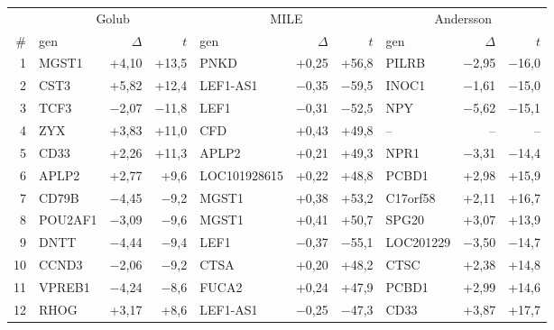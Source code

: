 \begin{tabular}{@{}r lrr lrr lrr@{}}
\toprule
 & \multicolumn{3}{c}{Golub} & \multicolumn{3}{c}{MILE} & \multicolumn{3}{c}{Andersson}\\
\cmidrule(lr){2-4}\cmidrule(lr){5-7}\cmidrule(l){8-10}
\# & gen & $\Delta$ & $t$ & gen & $\Delta$ & $t$ & gen & $\Delta$ & $t$\\ \midrule
1 & MGST1 & +4{,}10 & +13{,}5 & PNKD & +0{,}25 & +56{,}8 & PILRB & \ensuremath{-}2{,}95 & \ensuremath{-}16{,}0\\
2 & CST3 & +5{,}82 & +12{,}4 & LEF1-AS1 & \ensuremath{-}0{,}35 & \ensuremath{-}59{,}5 & INOC1 & \ensuremath{-}1{,}61 & \ensuremath{-}15{,}0\\
3 & TCF3 & \ensuremath{-}2{,}07 & \ensuremath{-}11{,}8 & LEF1 & \ensuremath{-}0{,}31 & \ensuremath{-}52{,}5 & NPY & \ensuremath{-}5{,}62 & \ensuremath{-}15{,}1\\
4 & ZYX & +3{,}83 & +11{,}0 & CFD & +0{,}43 & +49{,}8 & -- & -- & --\\
5 & CD33 & +2{,}26 & +11{,}3 & APLP2 & +0{,}21 & +49{,}3 & NPR1 & \ensuremath{-}3{,}31 & \ensuremath{-}14{,}4\\
6 & APLP2 & +2{,}77 & +9{,}6 & LOC101928615 & +0{,}22 & +48{,}8 & PCBD1 & +2{,}98 & +15{,}9\\
7 & CD79B & \ensuremath{-}4{,}45 & \ensuremath{-}9{,}2 & MGST1 & +0{,}38 & +53{,}2 & C17orf58 & +2{,}11 & +16{,}7\\
8 & POU2AF1 & \ensuremath{-}3{,}09 & \ensuremath{-}9{,}6 & MGST1 & +0{,}41 & +50{,}7 & SPG20 & +3{,}07 & +13{,}9\\
9 & DNTT & \ensuremath{-}4{,}44 & \ensuremath{-}9{,}4 & LEF1 & \ensuremath{-}0{,}37 & \ensuremath{-}55{,}1 & LOC201229 & \ensuremath{-}3{,}50 & \ensuremath{-}14{,}7\\
10 & CCND3 & \ensuremath{-}2{,}06 & \ensuremath{-}9{,}2 & CTSA & +0{,}20 & +48{,}2 & CTSC & +2{,}38 & +14{,}8\\
11 & VPREB1 & \ensuremath{-}4{,}24 & \ensuremath{-}8{,}6 & FUCA2 & +0{,}24 & +47{,}9 & PCBD1 & +2{,}99 & +14{,}6\\
12 & RHOG & +3{,}17 & +8{,}6 & LEF1-AS1 & \ensuremath{-}0{,}25 & \ensuremath{-}47{,}3 & CD33 & +3{,}87 & +17{,}7\\
\bottomrule
\end{tabular}
